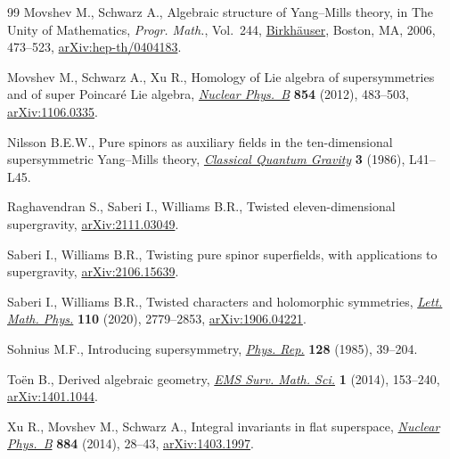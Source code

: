 \begin{thebibliography}{99}
Movshev M., Schwarz A., Algebraic structure of {Y}ang--{M}ills theory, in The
 Unity of Mathematics, \textit{Progr. Math.}, Vol.~244, \href{https://doi.org/10.1007/0-8176-4467-9_14}{Birkh\"auser},
 Boston, MA, 2006, 473--523, \href{https://arxiv.org/abs/hep-th/0404183}{arXiv:hep-th/0404183}.

Movshev M., Schwarz A., Xu R., Homology of {L}ie algebra of supersymmetries and
 of super {P}oincar\'e {L}ie algebra, \href{https://doi.org/10.1016/j.nuclphysb.2011.08.023}{\textit{Nuclear Phys.~B}} \textbf{854}
 (2012), 483--503, \href{https://arxiv.org/abs/1106.0335}{arXiv:1106.0335}.

Nilsson B.E.W., Pure spinors as auxiliary fields in the ten-dimensional
 supersymmetric {Y}ang--{M}ills theory, \href{https://doi.org/10.1088/0264-9381/3/2/007}{\textit{Classical Quantum Gravity}}
 \textbf{3} (1986), L41--L45.

Raghavendran S., Saberi I., Williams B.R., Twisted eleven-dimensional
 supergravity, \href{https://arxiv.org/abs/2111.03049}{arXiv:2111.03049}.

Saberi I., Williams B.R., Twisting pure spinor superfields, with applications
 to supergravity, \href{https://arxiv.org/abs/2106.15639}{arXiv:2106.15639}.

Saberi I., Williams B.R., Twisted characters and holomorphic symmetries,
 \href{https://doi.org/10.1007/s11005-020-01319-4}{\textit{Lett. Math. Phys.}} \textbf{110} (2020), 2779--2853,
 \href{https://arxiv.org/abs/1906.04221}{arXiv:1906.04221}.

Sohnius M.F., Introducing supersymmetry, \href{https://doi.org/10.1016/0370-1573(85)90023-7}{\textit{Phys. Rep.}} \textbf{128}
 (1985), 39--204.

To\"en B., Derived algebraic geometry, \href{https://doi.org/10.4171/EMSS/4}{\textit{EMS Surv. Math. Sci.}} \textbf{1}
 (2014), 153--240, \href{https://arxiv.org/abs/1401.1044}{arXiv:1401.1044}.

Xu R., Movshev M., Schwarz A., Integral invariants in flat superspace,
 \href{https://doi.org/10.1016/j.nuclphysb.2014.04.009}{\textit{Nuclear Phys.~B}} \textbf{884} (2014), 28--43, \href{https://arxiv.org/abs/1403.1997}{arXiv:1403.1997}.

\end{thebibliography}

